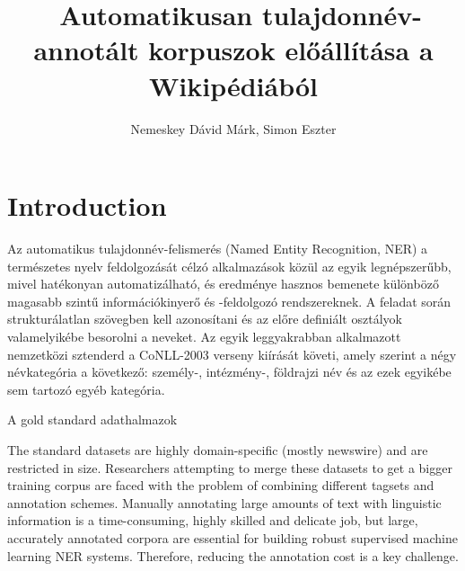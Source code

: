 \documentclass{llncs}
\begin{document}
\pagestyle{myheadings}
\def\leftmark{{\rm IX. Magyar Sz\'am\'\i t\'og\'epes Nyelv\'eszeti Konferencia}}
\def\rightmark{{\rm Szeged, 2013. január 7-8.}}

\setcounter{page}{3}

\title{\ \break Automatikusan tulajdonnév-annotált korpuszok előállítása a Wikipédiából}
\author{Nemeskey Dávid Márk, Simon Eszter}

\maketitle

\section{Introduction}

Az automatikus tulajdonnév-felismerés (Named Entity Recognition, NER) a természetes nyelv feldolgozását célzó alkalmazások közül az egyik legnépszerűbb, mivel hatékonyan automatizálható, és eredménye hasznos bemenete különböző magasabb szintű információkinyerő és -feldolgozó rendszereknek. A feladat során strukturálatlan szövegben kell azonosítani és az előre definiált osztályok valamelyikébe besorolni a neveket. Az egyik leggyakrabban alkalmazott nemzetközi sztenderd a CoNLL-2003 verseny kiírását követi, amely szerint a négy névkategória a következő: személy-, intézmény-, földrajzi név és az ezek egyikébe sem tartozó egyéb kategória. 


A gold standard adathalmazok 

The standard datasets are highly domain-specific (mostly newswire) and are
restricted in size. Researchers attempting to merge these datasets to get a bigger training corpus are faced with the
problem of combining different tagsets and annotation schemes. Manually
annotating large amounts of text with linguistic information is a
time-consuming, highly skilled and delicate job, but large, accurately
annotated corpora are essential for building robust supervised machine
learning NER systems. Therefore, reducing the annotation cost is a key
challenge.
\end{document}
